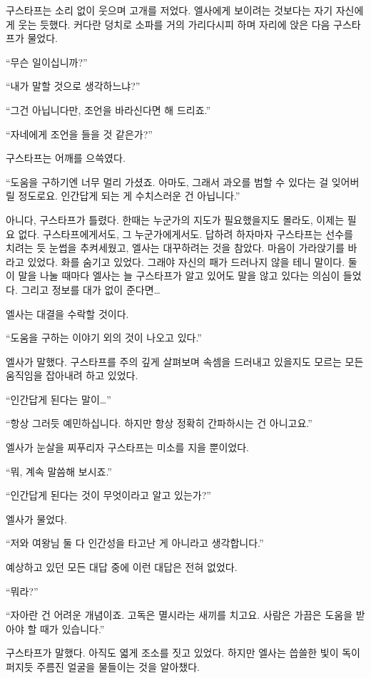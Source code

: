 구스타프는 소리 없이 웃으며 고개를 저었다. 엘사에게 보이려는 것보다는 자기 자신에게 웃는 듯했다. 커다란 덩치로 소파를 거의 가리다시피 하며 자리에 앉은 다음 구스타프가 물었다.

``무슨 일이십니까?''

``내가 말할 것으로 생각하느냐?''

``그건 아닙니다만, 조언을 바라신다면 해 드리죠.''

``자네에게 조언을 들을 것 같은가?''

구스타프는 어깨를 으쓱였다.

``도움을 구하기엔 너무 멀리 가셨죠. 아마도, 그래서 과오를 범할 수 있다는 걸 잊어버릴 정도로요. 인간답게 되는 게 수치스러운 건 아닙니다.''

아니다, 구스타프가 틀렸다. 한때는 누군가의 지도가 필요했을지도 몰라도, 이제는 필요 없다. 구스타프에게서도, 그 누군가에게서도. 답하려 하자마자 구스타프는 선수를 치려는 듯 눈썹을 추켜세웠고, 엘사는 대꾸하려는 것을 참았다. 마음이 가라앉기를 바라고 있었다. 화를 숨기고 있었다. 그래야 자신의 패가 드러나지 않을 테니 말이다. 둘이 말을 나눌 때마다 엘사는 늘 구스타프가 알고 있어도 말을 않고 있다는 의심이 들었다. 그리고 정보를 대가 없이 준다면\ldots

엘사는 대결을 수락할 것이다.

``도움을 구하는 이야기 외의 것이 나오고 있다.''

엘사가 말했다. 구스타프를 주의 깊게 살펴보며 속셈을 드러내고 있을지도 모르는 모든 움직임을 잡아내려 하고 있었다.

``인간답게 된다는 말이\ldots''

``항상 그러듯 예민하십니다. 하지만 항상 정확히 간파하시는 건 아니고요.''

엘사가 눈살을 찌푸리자 구스타프는 미소를 지을 뿐이었다.

``뭐, 계속 말씀해 보시죠.''

``인간답게 된다는 것이 무엇이라고 알고 있는가?''

엘사가 물었다.

``저와 여왕님 둘 다 인간성을 타고난 게 아니라고 생각합니다.''

예상하고 있던 모든 대답 중에 이런 대답은 전혀 없었다.

``뭐라?''

``자아란 건 어려운 개념이죠. 고독은 멸시라는 새끼를 치고요. 사람은 가끔은 도움을 받아야 할 때가 있습니다.''

구스타프가 말했다. 아직도 엷게 조소를 짓고 있었다. 하지만 엘사는 씁쓸한 빛이 독이 퍼지듯 주름진 얼굴을 물들이는 것을 알아챘다.

